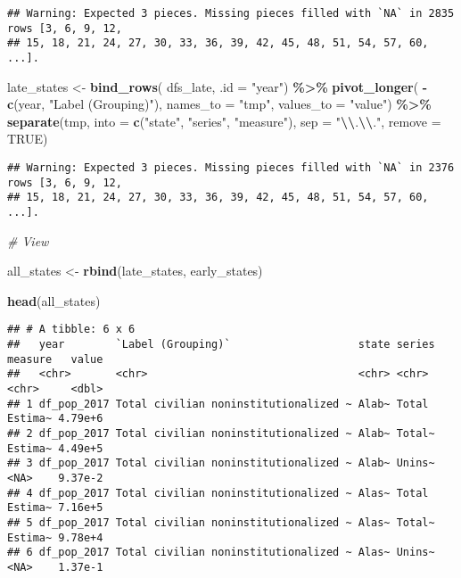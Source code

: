 \documentclass[
]{article}
\newenvironment{Shaded}{\begin{snugshade}}{\end{snugshade}}
\newcommand{\AttributeTok}[1]{\textcolor[rgb]{0.13,0.29,0.53}{#1}}
\newcommand{\CommentTok}[1]{\textcolor[rgb]{0.56,0.35,0.01}{\textit{#1}}}
\newcommand{\ConstantTok}[1]{\textcolor[rgb]{0.56,0.35,0.01}{#1}}
\newcommand{\FunctionTok}[1]{\textcolor[rgb]{0.13,0.29,0.53}{\textbf{#1}}}
\newcommand{\NormalTok}[1]{#1}
\newcommand{\OtherTok}[1]{\textcolor[rgb]{0.56,0.35,0.01}{#1}}
\newcommand{\SpecialCharTok}[1]{\textcolor[rgb]{0.81,0.36,0.00}{\textbf{#1}}}
\newcommand{\StringTok}[1]{\textcolor[rgb]{0.31,0.60,0.02}{#1}}
\begin{document}
\begin{verbatim}
## Warning: Expected 3 pieces. Missing pieces filled with `NA` in 2835 rows [3, 6, 9, 12,
## 15, 18, 21, 24, 27, 30, 33, 36, 39, 42, 45, 48, 51, 54, 57, 60, ...].
\end{verbatim}

\begin{Shaded}
\begin{Highlighting}[]
\NormalTok{late\_states }\OtherTok{\textless{}{-}} \FunctionTok{bind\_rows}\NormalTok{(}
\NormalTok{  dfs\_late, }\AttributeTok{.id =} \StringTok{"year"}\NormalTok{) }\SpecialCharTok{\%\textgreater{}\%}
  \FunctionTok{pivot\_longer}\NormalTok{(}
    \SpecialCharTok{{-}}\FunctionTok{c}\NormalTok{(year, }\StringTok{"Label (Grouping)"}\NormalTok{),}
    \AttributeTok{names\_to =} \StringTok{"tmp"}\NormalTok{,}
    \AttributeTok{values\_to =} \StringTok{"value"}\NormalTok{) }\SpecialCharTok{\%\textgreater{}\%}
  \FunctionTok{separate}\NormalTok{(tmp,}
           \AttributeTok{into =} \FunctionTok{c}\NormalTok{(}\StringTok{"state"}\NormalTok{, }\StringTok{"series"}\NormalTok{, }\StringTok{"measure"}\NormalTok{),}
           \AttributeTok{sep =} \StringTok{"}\SpecialCharTok{\textbackslash{}\textbackslash{}}\StringTok{.}\SpecialCharTok{\textbackslash{}\textbackslash{}}\StringTok{."}\NormalTok{,}
           \AttributeTok{remove =} \ConstantTok{TRUE}\NormalTok{)}
\end{Highlighting}
\end{Shaded}

\begin{verbatim}
## Warning: Expected 3 pieces. Missing pieces filled with `NA` in 2376 rows [3, 6, 9, 12,
## 15, 18, 21, 24, 27, 30, 33, 36, 39, 42, 45, 48, 51, 54, 57, 60, ...].
\end{verbatim}

\begin{Shaded}
\begin{Highlighting}[]
\CommentTok{\# View}

\NormalTok{all\_states }\OtherTok{\textless{}{-}} \FunctionTok{rbind}\NormalTok{(late\_states, early\_states)}

\FunctionTok{head}\NormalTok{(all\_states)}
\end{Highlighting}
\end{Shaded}

\begin{verbatim}
## # A tibble: 6 x 6
##   year        `Label (Grouping)`                    state series measure   value
##   <chr>       <chr>                                 <chr> <chr>  <chr>     <dbl>
## 1 df_pop_2017 Total civilian noninstitutionalized ~ Alab~ Total  Estima~ 4.79e+6
## 2 df_pop_2017 Total civilian noninstitutionalized ~ Alab~ Total~ Estima~ 4.49e+5
## 3 df_pop_2017 Total civilian noninstitutionalized ~ Alab~ Unins~ <NA>    9.37e-2
## 4 df_pop_2017 Total civilian noninstitutionalized ~ Alas~ Total  Estima~ 7.16e+5
## 5 df_pop_2017 Total civilian noninstitutionalized ~ Alas~ Total~ Estima~ 9.78e+4
## 6 df_pop_2017 Total civilian noninstitutionalized ~ Alas~ Unins~ <NA>    1.37e-1
\end{verbatim}
\end{document}
